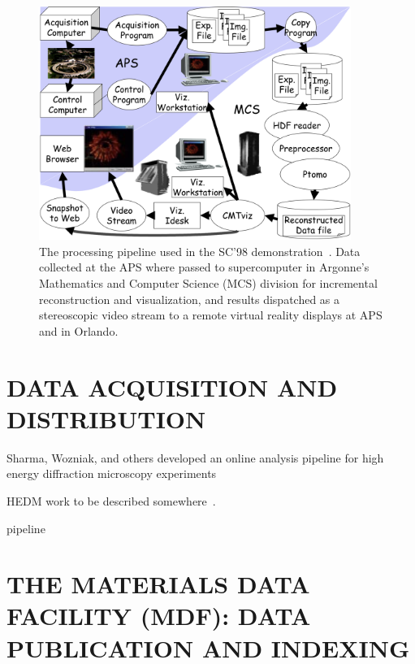 \documentclass{aip-cp}
\newcommand\ian[1]{}
\newcommand\ben[1]{}
\newcommand\ian[1]{{\color{red}[Ian: #1]}}
\newcommand\ben[1]{{\color{blue}[Ben: #1]}}
\begin{document}
\begin{figure}[h]
  \centerline{\includegraphics[width=4in]{Figs/APS-Fig.png}}
  \caption{The processing pipeline used in the SC'98 demonstration~\cite{von2000real}. Data collected at the APS 
  where passed to supercomputer in Argonne's Mathematics and Computer Science (MCS) division for
  incremental reconstruction and visualization, and results dispatched as a stereoscopic
  video stream to a remote virtual reality displays at APS and in Orlando.\label{fig:sc98}}
\end{figure}

\section{DATA ACQUISITION AND DISTRIBUTION}

Sharma, Wozniak, and others developed an online analysis pipeline for high energy diffraction microscopy
experiments 

HEDM work to be described somewhere~\cite{park2015high}.

pipeline~\cite{wozniak2015big}


\ian{Petrel should get a mention.}



\section{THE MATERIALS DATA FACILITY (MDF): DATA PUBLICATION AND INDEXING}

\ben{Add MDF overview text and text linking this to the other sections}
\end{document}
